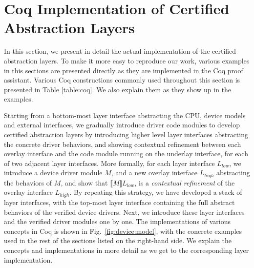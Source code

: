 \section{Coq Implementation of Certified Abstraction Layers}
\label{sec:layers}

In this section, we present in detail the actual implementation of the
certified abstraction layers. To make it more easy to reproduce our work,
various examples in this sections are presented directly as they are
implemented in the Coq proof assistant. Various Coq constructions commonly
used throughout this section is presented in Table \ref{table:coq}.
We also explain them as they show up in the examples.

Starting from a bottom-most layer interface abstracting the CPU, device
models and external interfaces, we gradually introduce driver code modules
to develop certified abstraction layers by introducing higher level layer
interfaces abstracting the concrete driver behaviors, and showing contextual
refinement between each overlay interface and the code module running on
the underlay interface, for each of two adjacent layer interfaces.
More formally, for each layer interface $L_{low}$, we introduce a device driver module
$M$, and a new overlay interface $L_{high}$ abstracting the behaviors of $M$, and
show that $\llbracket{}M\rrbracket{}L_{low}$, is
a {\em contextual refinement} of the overlay interface $L_{high}$.
By repeating this strategy, we have developed a stack of layer interfaces,
with the top-most layer interface containing the full abstract behaviors of
the verified device drivers. Next, we introduce these layer interfaces and
the verified driver modules one by one. The implementations of various
concepts in Coq is shown in Fig.~\ref{fig:device:model}, with the concrete
examples used in the rest of the sections listed on the right-hand side.
We explain the concepts and implementations in more detail as we get to the
corresponding layer implementation.


